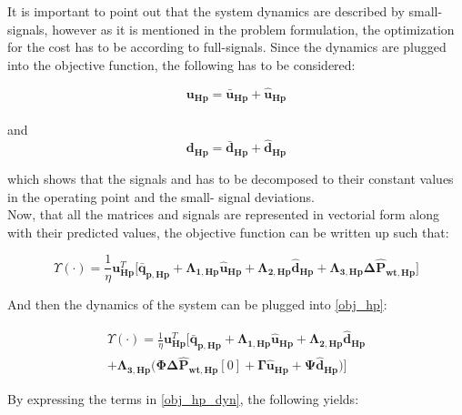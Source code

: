 It is important to point out that the system dynamics are described by small-signals, however as it is mentioned in the problem formulation, the optimization for the cost has to be according to full-signals. Since the dynamics are plugged into the objective function, the following has to be considered: 

\begin{equation}
\bm{u_{H{p}}} = \bm{\bar{u}_{H{p}}} + \bm{\hat{u}_{H{p}}}
\label{u_pred}
\end{equation}\\
and\\
\begin{equation}
\bm{d_{H{p}}} = \bm{\bar{d}_{H{p}}} + \bm{\hat{d}_{H{p}}}
\end{equation}

which shows that the signals and has to be decomposed to their constant values in the operating point and the small- signal deviations. 
\\
\newline
Now, that all the matrices and signals are represented in vectorial form along with their predicted values, the objective function can be written up such that:

\begin{equation}
  \Upsilon(\cdot) = \frac{1}{\eta} {\bm{{u}}}_{\bm{{Hp}}}^{T}\bigg[ {\bm{\bar{q}}}_{\bm{p,Hp}} + {\bm{\Lambda}}_{\bm{1,Hp}} {\bm{\hat{u}}}_{\bm{Hp}} + {\bm{\Lambda}}_{\bm{2,Hp}} {\bm{\hat{d}}}_{\bm{Hp}} 
  + {\bm{\Lambda}}_{\bm{3,Hp}} \bm{\Delta \hat{P}_{wt,Hp}} \bigg]
 \label{obj_hp}
\end{equation}

And then the dynamics of the system can be plugged into \eqref{obj_hp}:

\begin{equation}
\begin{aligned}
 \Upsilon(\cdot) = \frac{1}{\eta} {\bm{{u}}}_{\bm{Hp}}^{T}\bigg[ {\bm{\bar{q}}}_{\bm{p,Hp}} + {\bm{\Lambda}}_{\bm{1,Hp}} {\bm{\hat{u}}}_{\bm{Hp}} + {\bm{\Lambda}}_{\bm{2,Hp}} {\bm{\hat{d}}}_{\bm{Hp}} 
   \\ + {\bm{\Lambda}}_{\bm{3,Hp}} \bigg( \bm{\Phi} \bm{\Delta \hat{P}_{\bm{wt,Hp}}}[0] + \bm{\Gamma} \bm{\hat{u}}_{\bm{Hp}} + \bm{\Psi}\bm{\hat{d}}_{\bm{Hp}} \bigg) \bigg]
\end{aligned}
\label{obj_hp_dyn}
\end{equation}

By expressing the terms in \eqref{obj_hp_dyn}, the following yields:

